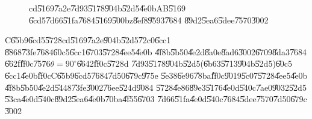 \documentclass[12pt,a4paper]{article}
\begin{document}
\begin{figure}[th]
\caption{cd\U{5169}\U{7a2e}\U{7d93}\U{5178}\U{904b}\U{52d5}\U{4e0b}AB\U{5169}%
\U{6cd5}\U{7d66}\U{51fa}\U{7684}\U{5169}\U{500b}z\U{8ef8}\U{9593}\U{7684}%
\U{89d2}\U{5ea6}\U{5dee}\U{7570}\U{3002}}
\begin{center}
\frame{}
\end{center}
\end{figure}

C\U{65b9}\U{6cd5}\U{5728}cd\U{5169}\U{7a2e}\U{904b}\U{52d5}\U{72c0}\U{6cc1}%
\U{8868}\U{73fe}\U{7684}\U{60c5}\U{6cc1}\U{6703}\U{5728}\U{4ee5}\U{4e0b}%
\U{4f8b}\U{5b50}\U{4e2d}\U{8a0e}\U{8ad6}\U{3002}\U{6709}\U{8da3}\U{7684}%
\U{662f}\U{ff0c}\U{7576}$\theta =90^{\circ }$\U{6642}\U{ff0c}\U{5728}d%
\U{7d93}\U{5178}\U{904b}\U{52d5}(\U{6b63}\U{5713}\U{904b}\U{52d5})\U{60c5}%
\U{6cc1}\U{4e0b}\U{ff0c}C\U{65b9}\U{6cd5}\U{7684}\U{7d50}\U{679c}\U{975e}%
\U{5e38}\U{6e96}\U{78ba}\U{ff0c}\U{9019}\U{5c07}\U{5728}\U{4ee5}\U{4e0b}%
\U{4f8b}\U{5b50}\U{4e2d}\U{5448}\U{73fe}\U{3002}\U{76ee}\U{524d}\U{9084}%
\U{5728}\U{4e86}\U{89e3}\U{5176}\U{4e0d}\U{540c}\U{7ae0}\U{9032}\U{52d5}%
\U{53ca}\U{4e0d}\U{540c}\U{89d2}\U{5ea6}\U{4e0b}\U{70ba}\U{4f55}\U{6703}%
\U{7d66}\U{51fa}\U{4e0d}\U{540c}\U{7684}\U{5dee}\U{7570}\U{7d50}\U{679c}%
\U{3002}
\end{document}
